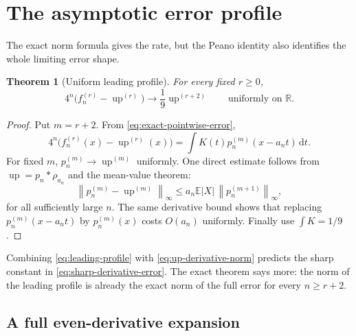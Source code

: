 \documentclass[11pt,oneside]{article}
\newtheorem{theorem}{Theorem}[section]
\theoremstyle{definition}
\theoremstyle{remark}
\newcommand{\R}{\mathbb R}
\newcommand{\E}{\mathbb E}
\newcommand{\Up}{\operatorname{up}}
\newcommand{\conv}{*}
\newcommand{\dd}{\,\mathrm d}
\newcommand{\norm}[1]{\left\lVert#1\right\rVert}
\begin{document}
\section{The asymptotic error profile}
\label{sec:asymptotic-profile}

The exact norm formula gives the rate, but the Peano identity also identifies the whole
limiting error shape.

\begin{theorem}[Uniform leading profile]
\label{thm:leading-profile}
For every fixed $r\ge0$,
\begin{equation}
 4^n\bigl(f_n^{(r)}-\Up^{(r)}\bigr)
 \longrightarrow \frac19\Up^{(r+2)}
 \qquad\text{uniformly on }\R.
 \label{eq:leading-profile}
\end{equation}
\end{theorem}

\begin{proof}
Put $m=r+2$.  From \eqref{eq:exact-pointwise-error},
\[
 4^n\bigl(f_n^{(r)}(x)-\Up^{(r)}(x)\bigr)
 =\int K(t)p_n^{(m)}(x-a_nt)\dd t.
\]
For fixed $m$, $p_n^{(m)}\to\Up^{(m)}$ uniformly.  One direct estimate follows from
$\Up=p_n\conv\rho_{a_n}$ and the mean-value theorem:
\[
 \norm{p_n^{(m)}-\Up^{(m)}}_\infty
 \le a_n\E|X|\,\norm{p_n^{(m+1)}}_\infty,
\]
for all sufficiently large $n$.  The same derivative bound shows that replacing
$p_n^{(m)}(x-a_nt)$ by $p_n^{(m)}(x)$ costs $O(a_n)$ uniformly.  Finally use
$\int K=1/9$.
\end{proof}

Combining \eqref{eq:leading-profile} with \eqref{eq:up-derivative-norm} predicts the sharp
constant in \eqref{eq:sharp-derivative-error}.  The exact theorem says more: the norm of the
leading profile is already the exact norm of the full error for every $n\ge r+2$.

\subsection{A full even-derivative expansion}
\end{document}
